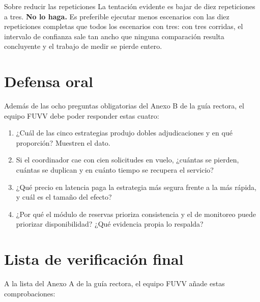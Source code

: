 \documentclass[11pt,a4paper]{article}
\begin{document}
\begin{avisoBox}{Sobre reducir las repeticiones}
	La tentación evidente es bajar de diez repeticiones a tres. \textbf{No lo haga.} Es preferible ejecutar menos escenarios con las diez repeticiones completas que todos los escenarios con tres: con tres corridas, el intervalo de confianza sale tan ancho que ninguna comparación resulta concluyente y el trabajo de medir se pierde entero.
\end{avisoBox}

\section{Defensa oral}

Además de las ocho preguntas obligatorias del Anexo B de la guía rectora, el equipo FUVV debe poder responder estas cuatro:

\begin{enumerate}[leftmargin=*,itemsep=3pt]
	\item ¿Cuál de las cinco estrategias produjo dobles adjudicaciones y en qué proporción? Muestren el dato.
	\item Si el coordinador cae con cien solicitudes en vuelo, ¿cuántas se pierden, cuántas se duplican y en cuánto tiempo se recupera el servicio?
	\item ¿Qué precio en latencia paga la estrategia más segura frente a la más rápida, y cuál es el tamaño del efecto?
	\item ¿Por qué el módulo de reservas prioriza consistencia y el de monitoreo puede priorizar disponibilidad? ¿Qué evidencia propia lo respalda?
\end{enumerate}

\section{Lista de verificación final}

A la lista del Anexo A de la guía rectora, el equipo FUVV añade estas comprobaciones:
\end{document}
